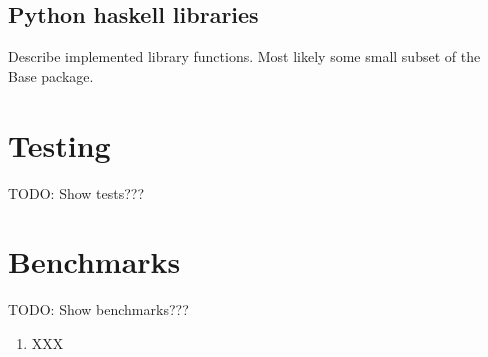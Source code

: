 \documentclass{article}
\begin{document}
\subsection{Python haskell libraries}

Describe implemented library functions. Most likely some small subset of the Base package.

\section{Testing}

TODO: Show tests???

\section{Benchmarks}

TODO: Show benchmarks???





\begin{enumerate}
\item XXX
\end{enumerate}
\end{document}
